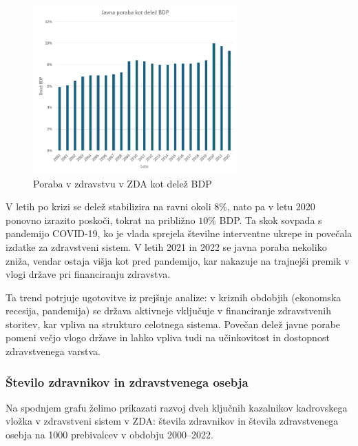 \documentclass[12pt,a4paper]{article}
\theoremstyle{definition}
\begin{document}
\begin{figure}[H]
    \centering
    \includegraphics[width=0.7\textwidth]{zda_poraba_delez_BDP.png}
    \caption{Poraba v zdravstvu v ZDA kot delež BDP}
    \label{fig:zda_poraba_delez_BDP}
\end{figure}

V letih po krizi se delež stabilizira na ravni okoli $8\%$, nato pa v letu 2020 
ponovno izrazito poskoči, tokrat na približno $10\%$ BDP. Ta skok sovpada s pandemijo COVID-19, 
ko je vlada sprejela številne interventne ukrepe in povečala izdatke za zdravstveni sistem. 
V letih 2021 in 2022 se javna poraba nekoliko zniža, vendar ostaja višja kot pred pandemijo, 
kar nakazuje na trajnejši premik v vlogi države pri financiranju zdravstva.

Ta trend potrjuje ugotovitve iz prejšnje analize: v kriznih obdobjih (ekonomska recesija, pandemija) 
se država aktivneje vključuje v financiranje zdravstvenih storitev, kar vpliva na strukturo celotnega sistema. 
Povečan delež javne porabe pomeni večjo vlogo države in lahko vpliva tudi na učinkovitost in dostopnost zdravstvenega varstva.

\subsubsection{Število zdravnikov in zdravstvenega osebja}

Na spodnjem grafu želimo prikazati razvoj dveh ključnih kazalnikov kadrovskega vložka v zdravstveni sistem v ZDA: 
števila zdravnikov in števila zdravstvenega osebja na 1000 prebivalcev v obdobju 2000–2022.
\end{document}
